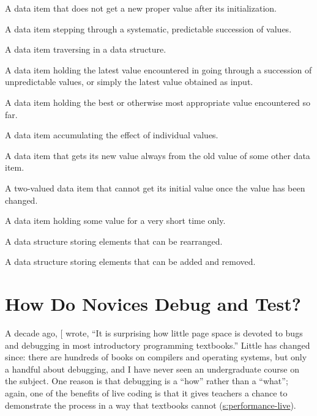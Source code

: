 \begin{description}
\tightlist
\item[Fixed value:]
A data item that does not get a new proper value after its
initialization.
\item[Stepper:]
A data item stepping through a systematic, predictable succession of
values.
\item[Walker:]
A data item traversing in a data structure.
\item[Most-recent holder:]
A data item holding the latest value encountered in going through a
succession of unpredictable values, or simply the latest value
obtained as input.
\item[Most-wanted holder:]
A data item holding the best or otherwise most appropriate value
encountered so far.
\item[Gatherer:]
A data item accumulating the effect of individual values.
\item[Follower:]
A data item that gets its new value always from the old value of
some other data item.
\item[One-way flag:]
A two-valued data item that cannot get its initial value once the
value has been changed.
\item[Temporary:]
A data item holding some value for a very short time only.
\item[Organizer:]
A data structure storing elements that can be rearranged.
\item[Container:]
A data structure storing elements that can be added and removed.
\end{description}

\section{How Do Novices Debug and Test?}\label{s:pck-debug}

A decade ago, {[}\protect[\hyperlink{b:McCa2008}{McCa2008}]{]} wrote, ``It is surprising how little
page space is devoted to bugs and debugging in most introductory
programming textbooks.'' Little has changed since: there are hundreds of
books on compilers and operating systems, but only a handful about
debugging, and I have never seen an undergraduate course on the subject.
One reason is that debugging is a ``how'' rather than a ``what''; again, one
of the benefits of live coding is that it gives teachers a chance to
demonstrate the process in a way that textbooks cannot
(\protect\hyperlink{SECTION}{s:performance-live}).

